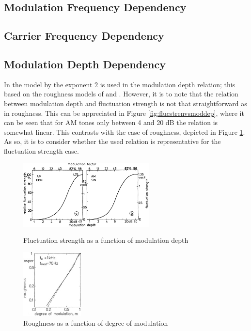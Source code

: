 \documentclass[a4paper]{article}
\begin{document}
\subsection{Modulation Frequency Dependency}

\subsection{Carrier Frequency Dependency}

\subsection{Modulation Depth Dependency}

In the model by \citet{Sontacchi1998} the exponent $2$ is used in the modulation
depth relation; this based on the roughness models of
\citet{aures1985berechnungsverfahren} and \citet{daniel1997psychoacoustical}.
However, it is to note that the relation between modulation depth and
fluctuation strength is not that straightforward as in roughness. This can be
appreciated in Figure \ref{fig:flucstrenvsmoddep}, where it can be seen that for
AM tones only between 4 and 20 dB the relation is somewhat linear. This
contrasts with the case of roughness, depicted in Figure \ref{fig:roughdegmod}.
As so, it is to consider whether the used relation is representative for the
fluctuation strength case.

\begin{figure}[ht]
    \centering
    \begin{minipage}[b]{0.45\linewidth}
        \centering
        \includegraphics[height=3.5cm]
            {book/img/Fastl2007-FluctuationStrengthVsModulationDepth}
        \caption{Fluctuation strength as a function of modulation depth
            \cite[pp. 249]{Fastl2007Psychoacoustics}}
        \label{fig:flucstrenvsmoddep}
    \end{minipage}
    \quad
    \begin{minipage}[b]{0.45\linewidth}
        \centering
        \includegraphics[height=3.5cm]
            {book/img/Fastl2007-RoughnessDegreeModulation}
        \caption{Roughness as a function of degree of modulation
            \cite[pp. 258]{Fastl2007Psychoacoustics}}
        \label{fig:roughdegmod}
    \end{minipage}
\end{figure}



\end{document}
